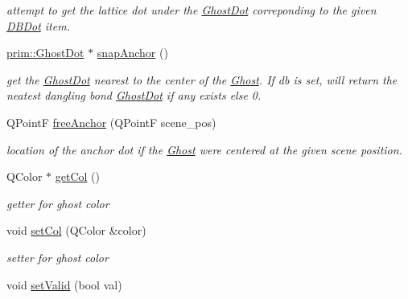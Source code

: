 \begin{DoxyCompactItemize}
\begin{DoxyCompactList}\small\item\em attempt to get the lattice dot under the \hyperlink{classprim_1_1GhostDot}{Ghost\+Dot} correponding to the given \hyperlink{classprim_1_1DBDot}{D\+B\+Dot} item. \end{DoxyCompactList}\item 
\hyperlink{classprim_1_1GhostDot}{prim\+::\+Ghost\+Dot} $\ast$ \hyperlink{classprim_1_1Ghost_a2558b908740d3f990cc7fec51a058802}{snap\+Anchor} ()\hypertarget{classprim_1_1Ghost_a2558b908740d3f990cc7fec51a058802}{}\label{classprim_1_1Ghost_a2558b908740d3f990cc7fec51a058802}

\begin{DoxyCompactList}\small\item\em get the \hyperlink{classprim_1_1GhostDot}{Ghost\+Dot} nearest to the center of the \hyperlink{classprim_1_1Ghost}{Ghost}. If db is set, will return the neatest dangling bond \hyperlink{classprim_1_1GhostDot}{Ghost\+Dot} if any exists else 0. \end{DoxyCompactList}\item 
Q\+PointF \hyperlink{classprim_1_1Ghost_a070edb8e12dcbca0004419d84a1d6352}{free\+Anchor} (Q\+PointF scene\+\_\+pos)\hypertarget{classprim_1_1Ghost_a070edb8e12dcbca0004419d84a1d6352}{}\label{classprim_1_1Ghost_a070edb8e12dcbca0004419d84a1d6352}

\begin{DoxyCompactList}\small\item\em location of the anchor dot if the \hyperlink{classprim_1_1Ghost}{Ghost} were centered at the given scene position. \end{DoxyCompactList}\item 
Q\+Color $\ast$ \hyperlink{classprim_1_1Ghost_a5beebb67cf4a0b3f6bfc72af3e13055f}{get\+Col} ()\hypertarget{classprim_1_1Ghost_a5beebb67cf4a0b3f6bfc72af3e13055f}{}\label{classprim_1_1Ghost_a5beebb67cf4a0b3f6bfc72af3e13055f}

\begin{DoxyCompactList}\small\item\em getter for ghost color \end{DoxyCompactList}\item 
void \hyperlink{classprim_1_1Ghost_add66c0767f3e9251e3532c07f7357923}{set\+Col} (Q\+Color \&color)\hypertarget{classprim_1_1Ghost_add66c0767f3e9251e3532c07f7357923}{}\label{classprim_1_1Ghost_add66c0767f3e9251e3532c07f7357923}

\begin{DoxyCompactList}\small\item\em setter for ghost color \end{DoxyCompactList}\item 
void \hyperlink{classprim_1_1Ghost_a9f7ed79e6ea56dacad0f2c4a0f6a503d}{set\+Valid} (bool val)\hypertarget{classprim_1_1Ghost_a9f7ed79e6ea56dacad0f2c4a0f6a503d}{}\label{classprim_1_1Ghost_a9f7ed79e6ea56dacad0f2c4a0f6a503d}


\end{DoxyCompactItemize}
